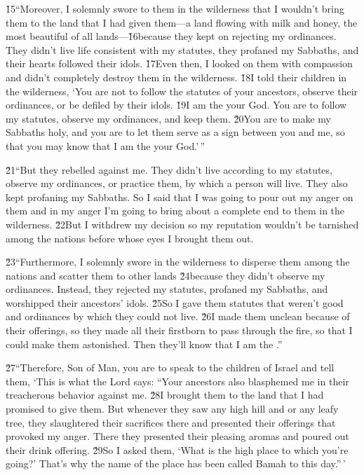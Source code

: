\v{15}``Moreover, I solemnly swore to them in the wilderness that I wouldn't bring them to the land that I had given them---a land flowing with milk and honey, the most beautiful of all lands---\v{16}because they kept on rejecting my ordinances. They didn't live life consistent with my statutes, they profaned my Sabbaths, and their hearts followed their idols. \v{17}Even then, I looked on them with compassion and didn't completely destroy them in the wilderness. \v{18}I told their children in the wilderness, `You are not to follow the statutes of your ancestors, observe their ordinances, or be defiled by their idols. \v{19}I am the  your God. You are to follow my statutes, observe my ordinances, and keep them. \v{20}You are to make my Sabbaths holy, and you are to let them serve as a sign between you and me, so that you may know that I am the  your God.'\,''

\v{21}``But they rebelled against me. They didn't live according to my statutes, observe my ordinances, or practice them, by which a person will live. They also kept profaning my Sabbaths. So I said that I was going to pour out my anger on them and in my anger I'm going to bring about a complete end to them in the wilderness. \v{22}But I withdrew my decision so my reputation wouldn't be tarnished among the nations before whose eyes I brought them out.

\v{23}``Furthermore, I solemnly swore in the wilderness to disperse them among the nations and scatter them to other lands \v{24}because they didn't observe my ordinances. Instead, they rejected my statutes, profaned my Sabbaths, and worshipped their ancestors' idols. \v{25}So I gave them statutes that weren't good and ordinances by which they could not live. \v{26}I made them unclean because of their offerings, so they made all their firstborn to pass through the fire, so that I could make them astonished. Then they'll know that I am the .''

\v{27}``Therefore, Son of Man, you are to speak to the children of Israel and tell them, `This is what the Lord  says: ``Your ancestors also blasphemed me in their treacherous behavior against me. \v{28}I brought them to the land that I had promised to give them. But whenever they saw any high hill and or any leafy tree, they slaughtered their sacrifices there and presented their offerings that provoked my anger. There they presented their pleasing aromas and poured out their drink offering. \v{29}So I asked them, `What is the high place to which you're going?' That's why the name of the place has been called Bamah to this day.''\,'

